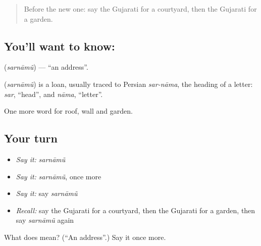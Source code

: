 \label{lesson:GU-C63-address}



\begin{quote}
Before the new one: say the Gujarati for a courtyard, then the Gujarati for a garden.
\end{quote}

\subsection*{You'll want to know: }
\textbf{} (\emph{sarnāmũ}) — \textquotedblleft{}an address\textquotedblright{}.

\begin{cousinweb}
\textbf{} (\emph{sarnāmũ}) is a loan, usually traced to Persian \emph{sar-nāma}, the heading of a letter: \emph{sar}, \textquotedblleft{}head\textquotedblright{}, and \emph{nāma}, \textquotedblleft{}letter\textquotedblright{}.
\end{cousinweb}

\begin{grammarlens}[title={What you've built}]
One more word for roof, wall and garden.
\end{grammarlens}

\subsection*{Your turn}
\begin{itemize}
\raggedright
  \item \emph{Say it:} \emph{sarnāmũ}
  \item \emph{Say it:} \emph{sarnāmũ}, once more
  \item \emph{Say it:} say \emph{sarnāmũ}
  \item \emph{Recall:} say the Gujarati for a courtyard, then the Gujarati for a garden, then say \emph{sarnāmũ} again
\end{itemize}

\begin{tcolorbox}[breakable,colback=teal!4,colframe=teal!35!black,title={Before you move on}]
What does  mean? (\textquotedblleft{}An address\textquotedblright{}.) Say it once more.
\end{tcolorbox}
